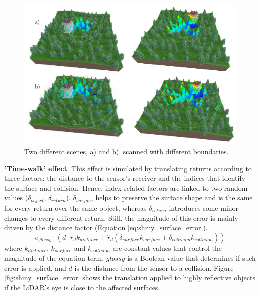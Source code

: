 \begin{figure}[ht]
	\centering
	\includegraphics[width=\linewidth]{figs/lidar_simulation/tls_maximum_range.png}
	\caption{Two different scenes, a) and b), scanned with different boundaries.}
	\label{fig:tls_maximum_range}
\end{figure}

\textbf{'Time-walk' effect}. This effect is simulated by translating returns according to three factors: the distance to the sensor's receiver and the indices that identify the surface and collision. Hence, index-related factors are linked to two random values ($\delta_{\textit{object}}$, $\delta_{\textit{return}}$). $\delta_{\textit{surface}}$ helps to preserve the surface shape and is the same for every return over the same object, whereas $\delta_{\textit{return}}$ introduces some minor changes to every different return. Still, the magnitude of this error is mainly driven by the distance factor (Equation \ref{eq:shiny_surface_error}).
\begin{equation}
    \label{eq:shiny_surface_error}
    e_{\textit{glossy}} \cdot (d \cdot \hat{r}_{d} k_{\textit{distance}} + \hat{r}_{d}(\delta_{\textit{surface}}k_{\textit{surface}} + \delta_{\textit{collision}}k_{\textit{collision}})) 
\end{equation}
where $k_{\textit{distance}}$, $k_{\textit{surface}}$ and $k_{\textit{collision}}$ are constant values that control the magnitude of the equation term, $\textit{glossy}$ is a Boolean value that determines if such error is applied, and $d$ is the distance from the sensor to a collision. Figure \ref{fig:shiny_surface_error} shows the translation applied to highly reflective objects if the LiDAR's eye is close to the affected surfaces.

